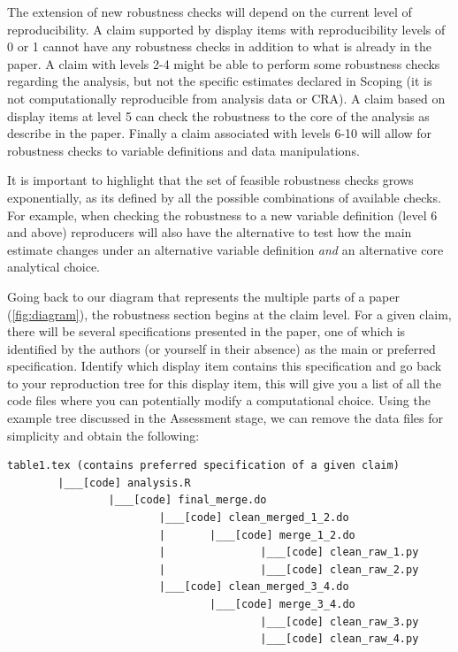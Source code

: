 \documentclass[]{book}
\begin{document}
The extension of new robustness checks will depend on the current level of reproducibility. A claim supported by display items with reproducibility levels of 0 or 1 cannot have any robustness checks in addition to what is already in the paper. A claim with levels 2-4 might be able to perform some robustness checks regarding the analysis, but not the specific estimates declared in Scoping (it is not computationally reproducible from analysis data or CRA). A claim based on display items at level 5 can check the robustness to the core of the analysis as describe in the paper. Finally a claim associated with levels 6-10 will allow for robustness checks to variable definitions and data manipulations.

It is important to highlight that the set of feasible robustness checks grows exponentially, as its defined by all the possible combinations of available checks. For example, when checking the robustness to a new variable definition (level 6 and above) reproducers will also have the alternative to test how the main estimate changes under an alternative variable definition \emph{and} an alternative core analytical choice.

Going back to our diagram that represents the multiple parts of a paper (\ref{fig:diagram}), the robustness section begins at the claim level. For a given claim, there will be several specifications presented in the paper, one of which is identified by the authors (or yourself in their absence) as the main or preferred specification. Identify which display item contains this specification and go back to your reproduction tree for this display item, this will give you a list of all the code files where you can potentially modify a computational choice. Using the example tree discussed in the Assessment stage, we can remove the data files for simplicity and obtain the following:

\begin{verbatim}
table1.tex (contains preferred specification of a given claim)
        |___[code] analysis.R
                |___[code] final_merge.do
                        |___[code] clean_merged_1_2.do
                        |       |___[code] merge_1_2.do
                        |               |___[code] clean_raw_1.py
                        |               |___[code] clean_raw_2.py
                        |___[code] clean_merged_3_4.do
                                |___[code] merge_3_4.do
                                        |___[code] clean_raw_3.py
                                        |___[code] clean_raw_4.py
                                        
\end{verbatim}
\end{document}
